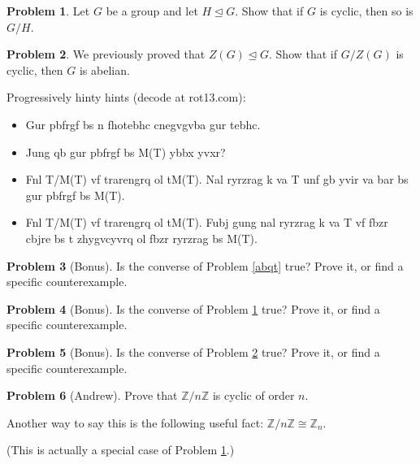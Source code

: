 \documentclass[12pt]{article}
\theoremstyle{definition} %
\newtheorem{problem}{Problem}
\newcommand{\Z}{\mathbb{Z}}
\def\normaleq{\unlhd}
\begin{document}
\begin{problem}\label{cyqt}
    Let $G$ be a group and let $H\normaleq G$. Show that if $G$ is cyclic, then so is $G/H$.
\end{problem}

\begin{problem}\label{zqt}
    We previously proved that $Z(G) \normaleq G$. Show that if $G/Z(G)$ is cyclic, then $G$ is abelian.

    Progressively hinty hints (decode at rot13.com):
    \begin{itemize}
        \item Gur pbfrgf bs n fhotebhc cnegvgvba gur tebhc.
        \item Jung qb gur pbfrgf bs M(T) ybbx yvxr?
        \item Fnl T/M(T) vf trarengrq ol tM(T). Nal ryrzrag k va T unf gb yvir va bar bs gur pbfrgf bs M(T).
        \item Fnl T/M(T) vf trarengrq ol tM(T). Fubj gung nal ryrzrag k va T vf fbzr cbjre bs t zhygvcyvrq ol fbzr ryrzrag bs M(T).
    \end{itemize}
\end{problem}

\begin{problem}[Bonus]
    Is the converse of Problem \ref{abqt} true? Prove it, or find a specific counterexample.
\end{problem}

\begin{problem}[Bonus]
    Is the converse of Problem \ref{cyqt} true? Prove it, or find a specific counterexample.
\end{problem}

\begin{problem}[Bonus]
    Is the converse of Problem \ref{zqt} true? Prove it, or find a specific counterexample.
\end{problem}

\begin{problem}[Andrew]
    Prove that $\Z/n\Z$ is cyclic of order $n$.

    Another way to say this is the following useful fact: $\Z/n\Z \cong \Z_n$.

    (This is actually a special case of Problem \ref{cyqt}.)
\end{problem}
\end{document}
